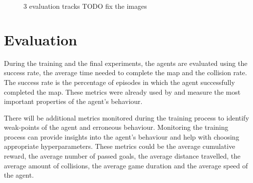 \begin{figure}
    \centering
         \qquad
         \qquad
         \qquad
    \caption{3 evaluation tracks TODO fix the images}
    \label{fig:3tracks}
\end{figure}

\section{Evaluation}

During the training and the final experiments, the agents are evaluated using the success rate, the average time needed to complete the map and the collision rate. The success rate is the percentage of episodes in which the agent successfully completed the map. These metrics were already used by \autocite{maximilian} and measure the most important properties of the agent's behaviour.

There will be additional metrics monitored during the training process to identify weak-points of the agent and erroneous behaviour. Monitoring the training process can provide insights into the agent's behaviour and help with choosing appropriate hyperparameters.
These metrics could be the average cumulative reward, the average number of passed goals, the average distance travelled, the average amount of collisions, the average game duration and the average speed of the agent.




